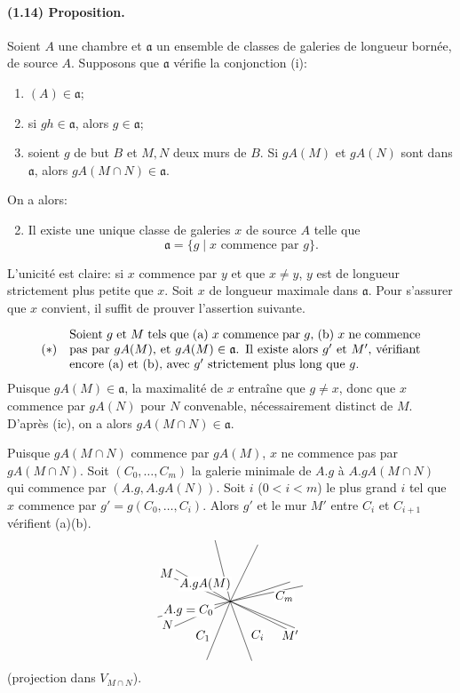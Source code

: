 \documentclass[10pt]{article}
\begin{document}
\paragraph{(1.14) Proposition.} Soient $A$ une chambre et $\mathfrak a$ un ensemble de classes de galeries de longueur bornée, de source $A$. Supposons que $\mathfrak a$ vérifie la conjonction (i):
\begin{enumerate}[label=(i\alph*)]
\item $(A)\in\mathfrak a$;
\item si $gh\in\mathfrak a$, alors $g\in\mathfrak a$;
\item soient $g$ de but $B$ et $M,N$ deux murs de $B$. Si $gA(M)$ et $gA(N)$ sont dans $\mathfrak a$, alors $gA(M\cap N)\in\mathfrak a$.
\end{enumerate}
On a alors:
\begin{enumerate}[label=(\roman*)]
\setcounter{enumi}{1}
\item Il existe une unique classe de galeries $x$ de source $A$ telle que
\[
\mathfrak a=\{g\mid x\text{ commence par }g\}.
\]
\end{enumerate}
L'unicité est claire: si $x$ commence par $y$ et que $x\ne y$, $y$ est de longueur strictement plus petite que $x$. Soit $x$ de longueur maximale dans $\mathfrak a$. Pour s'assurer que $x$ convient, il suffit de prouver l'assertion suivante.

\[
(*)\quad
\begin{minipage}{0.82\linewidth}
Soient $g$ et $M$ tels que (a) $x$ commence par $g$, (b) $x$ ne commence pas par $gA(M)$, et $gA(M)\in\mathfrak a$. Il existe alors $g'$ et $M'$, vérifiant encore (a) et (b), avec $g'$ strictement plus long que $g$.
\end{minipage}
\]
Puisque $gA(M)\in\mathfrak a$, la maximalité de $x$ entraîne que $g\ne x$, donc que $x$ commence par $gA(N)$ pour $N$ convenable, nécessairement distinct de $M$. D'après (ic), on a alors $gA(M\cap N)\in\mathfrak a$.

Puisque $gA(M\cap N)$ commence par $gA(M)$, $x$ ne commence pas par $gA(M\cap N)$. Soit $(C_0,\ldots,C_m)$ la galerie minimale de $A.g$ à $A.gA(M\cap N)$ qui commence par $(A.g,A.gA(N))$. Soit $i$ ($0<i<m$) le plus grand $i$ tel que $x$ commence par $g'=g(C_0,
\ldots,C_i)$. Alors $g'$ et le mur $M'$ entre $C_i$ et $C_{i+1}$ vérifient (a)(b).
\[
\begin{tikzpicture}[scale=0.92,baseline={(0,0)}]
\coordinate (O) at (0,0);
\foreach \a in {18,64,104,150,204,248,290,334}
  {\draw ({1.95*cos(\a)},{1.95*sin(\a)})--(O);}
\draw (-2.25,-0.48)--(2.25,0.48);
\draw (-2.00,0.82)--(2.00,-0.82);
\node[fill=white,inner sep=1pt,above left] at (-1.72,0.70) {$M$};
\node[fill=white,inner sep=1pt,above] at (-0.78,0.30) {$A.gA(M)$};
\node[fill=white,inner sep=1pt,below left] at (-0.48,-0.06) {$A.g=C_0$};
\node[fill=white,inner sep=1pt,right] at (1.35,0.16) {$C_m$};
\node[fill=white,inner sep=1pt,left] at (-1.72,-0.72) {$N$};
\node[fill=white,inner sep=1pt,below left] at (-0.58,-0.86) {$C_1$};
\node[fill=white,inner sep=1pt,below right] at (0.60,-0.84) {$C_i$};
\node[fill=white,inner sep=1pt,right] at (1.55,-1.03) {$M'$};
\end{tikzpicture}
\]
(projection dans $V_{M\cap N}$).
\end{document}
